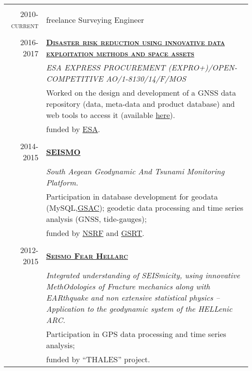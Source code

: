 \documentclass[a4paper,10pt]{article} %
\begin{document}
\begin{longtable}{r|p{13cm}}

\multicolumn{2}{c}{} \\
\textsc{2010-current} & freelance Surveying Engineer\\ 

\multicolumn{2}{c}{} \\
\textsc{2016-2017} & \textbf{\textsc{\href{http://www.astro.noa.gr/gr/research/projects/esa/}{Disaster risk reduction using innovative data exploitation methods and space assets}}}\\
  & \textit{\small ESA EXPRESS PROCUREMENT (EXPRO+)/OPEN-COMPETITIVE AO/1-8130/14/F/MOS}\\
  & Worked on the design and development of a GNSS data repository (data, meta-data and product database) and web tools to access it (available \href{http://ddrgsac.noa-gsp.terradue.com/ddrgsac}{here}).\\
  & funded by \href{http://www.esa.int/ESA}{ESA}.\\

\multicolumn{2}{c}{} \\
\textsc{2014-2015} & \textbf{\textsc{\href{http://dionysos.survey.ntua.gr/SEISMO/index.html}{SEISMO}}}\\
  & \textit{South Aegean Geodynamic And Tsunami Monitoring Platform.}\\
  & Participation in database development for geodata (MySQL,\href{http://www.unavco.org/software/data-management/gsac/gsac.html}{GSAC});
    geodetic data processing and time series analysis (GNSS, tide-gauges); \\
  & funded by \href{http://www.espa.gr/en/Pages/Default.aspx}{NSRF} and \href{http://www.gsrt.gr/central.aspx?sId=119I428I1089I323I488743}{GSRT}.\\

\multicolumn{2}{c}{} \\
\textsc{2012-2015} & \textbf{\textsc{\href{http://excellence.minedu.gov.gr/thales/en/thalesprojects/380208}{Seismo Fear Hellarc}}}\\
  & \textit{Integrated understanding of SEISmicity, using innovative MethOdologies of Fracture mechanics along with EARthquake and non extensive statistical physics – Application to the geodynamic system of the HELLenic ARC.}\\
  & Participation in GPS data processing and time series analysis;\\
  & funded by \textquotedblleft THALES\textquotedblright{} project.\\


\end{longtable}
\end{document}
